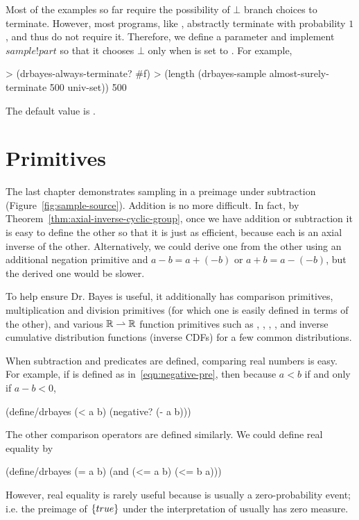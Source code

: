 Most of the examples so far require the possibility of $\bot$ branch choices to terminate.
However, most programs, like , abstractly terminate with probability $1$, and thus do not require it.
Therefore, we define a parameter  and implement $sample!part$ so that it chooses $\bot$ only when  is set to .
For example,
\begin{center}\singlespacing
\begin{schemedisplay}
> (drbayes-always-terminate? #f)
> (length (drbayes-sample almost-surely-terminate 500 univ-set))
500
\end{schemedisplay}
\end{center}
The default value is .

\section{Primitives}

The last chapter demonstrates sampling in a preimage under subtraction (Figure~\ref{fig:sample-source}).
Addition is no more difficult.
In fact, by Theorem~\ref{thm:axial-inverse-cyclic-group}, once we have addition or subtraction it is easy to define the other so that it is just as efficient, because each is an axial inverse of the other.
Alternatively, we could derive one from the other using an additional negation primitive and $a - b = a + (-b)$ or $a + b = a - (-b)$, but the derived one would be slower.

To help ensure Dr. Bayes is useful, it additionally has comparison primitives, multiplication and division primitives (for which one is easily defined in terms of the other), and various $\mathbb{R} \rightharpoonup \mathbb{R}$ function primitives such as , , , , and inverse cumulative distribution functions (inverse CDFs) for a few common distributions.

When subtraction and predicates are defined, comparing real numbers is easy.
For example, if  is defined as in~\eqref{eqn:negative-pre}, then because $a < b$ if and only if $a - b < 0$,
\begin{center}\singlespacing
\begin{schemedisplay}
(define/drbayes (< a b)
  (negative? (- a b)))
\end{schemedisplay}
\end{center}
The other comparison operators are defined similarly.
We could define real equality by
\begin{center}\singlespacing
\begin{schemedisplay}
(define/drbayes (= a b)
  (and (<= a b) (<= b a)))
\end{schemedisplay}
\end{center}
However, real equality is rarely useful because  is usually a zero-probability event; i.e. the preimage of $\{{true}\}$ under the interpretation of  usually has zero measure.

